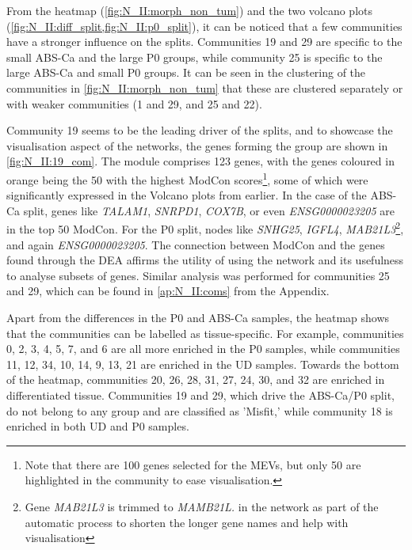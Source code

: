 From the heatmap (\cref{fig:N_II:morph_non_tum}) and the two volcano plots (\cref{fig:N_II:diff_split,fig:N_II:p0_split}), it can be noticed that a few communities have a stronger influence on the splits. Communities 19 and 29 are specific to the small ABS-Ca and the large P0 groups, while community 25 is specific to the large ABS-Ca and small P0 groups. It can be seen in the clustering of the communities in \cref{fig:N_II:morph_non_tum} that these are clustered separately or with weaker communities (1 and 29, and 25 and 22).



Community 19 seems to be the leading driver of the splits, and to showcase the visualisation aspect of the networks, the genes forming the group are shown in \cref{fig:N_II:19_com}. The module comprises 123 genes, with the genes coloured in orange being the 50 with the highest ModCon scores\footnote{Note that there are 100 genes selected for the MEVs, but only 50 are highlighted in the community to ease visualisation.}, some of which were significantly expressed in the Volcano plots from earlier. In the case of the ABS-Ca split, genes like \textit{TALAM1}, \textit{SNRPD1}, \textit{COX7B}, or even \textit{ENSG0000023205} are in the top 50 ModCon. For the P0 split, nodes like \textit{SNHG25}, \textit{IGFL4}, \textit{MAB21L3}\footnote{Gene \textit{MAB21L3} is trimmed to \textit{MAMB21L.} in the network as part of the automatic process to shorten the longer gene names and help with visualisation}, and again \textit{ENSG0000023205}. The connection between ModCon and the genes found through the DEA affirms the utility of using the network and its usefulness to analyse subsets of genes. Similar analysis was performed for communities 25 and 29, which can be found in \cref{ap:N_II:coms} from the Appendix.



Apart from the differences in the P0 and ABS-Ca samples, the heatmap shows that the communities can be labelled as tissue-specific. For example, communities 0, 2, 3, 4, 5, 7, and 6 are all more enriched in the P0 samples, while communities 11, 12, 34, 10, 14, 9, 13, 21 are enriched in the UD samples. Towards the bottom of the heatmap, communities 20, 26, 28, 31, 27, 24, 30, and 32 are enriched in differentiated tissue. Communities 19 and 29, which drive the ABS-Ca/P0 split, do not belong to any group and are classified as 'Misfit,' while community 18 is enriched in both UD and P0 samples.


